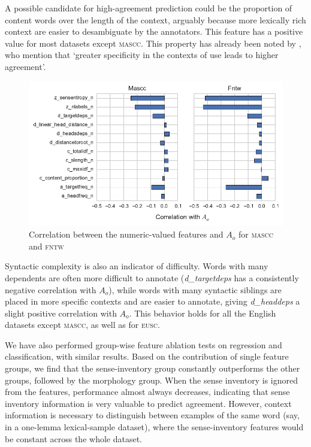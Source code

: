 \documentclass[11pt,a4paper]{article}
\begin{document}
A possible candidate for high-agreement prediction could be the proportion of content words over the length of the context, arguably because more lexically rich context are easier to desambiguate by the annotators. This feature has a positive value for most datasets except \textsc{mascc}. This property has already been noted by , who mention that `greater specificity in the contexts of use leads to higher agreement'.
\begin{figure}[htt]
\begin{center}
\includegraphics[scale=1.0]{mascc_fntw_a0_correlation.pdf}

\end{center}\caption{ \label{fig:correlations}Correlation between the numeric-valued features and $A_o$ for \textsc{mascc} and \textsc{fntw}}    
\end{figure}

Syntactic complexity is also an indicator of difficulty. Words with many dependents  are often more difficult to annotate (\textit{d\_targetdeps} has a consistently negative correlation with $A_o$), while words with many syntactic siblings  are placed in more specific contexts and are easier to annotate, giving \textit{d\_headdeps} a slight positive correlation with $A_o$. This behavior holds for all the English datasets except \textsc{mascc}, as well as for \textsc{eusc}.

We have also performed group-wise feature ablation tests on regression and classification, with similar results. Based on the contribution of single feature groups, we find that the sense-inventory group constantly outperforms the other groups, followed by the morphology group. 
When the sense inventory is ignored from the features, performance almost always decreases, indicating that sense inventory information is very valuable to predict agreement. However, context information is necessary to distinguish between examples of the same word (say, in a one-lemma lexical-sample dataset), where the sense-inventory features would be constant across the whole dataset. 
\end{document}

